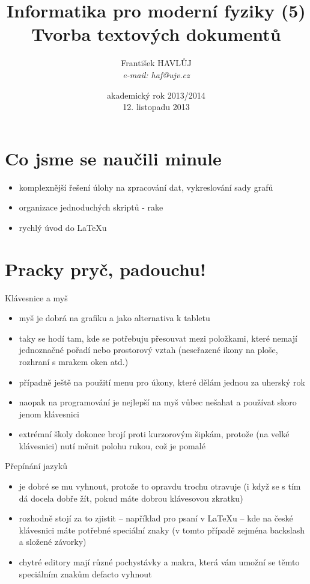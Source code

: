 \documentclass{beamer}
\title[IMF (5)]{Informatika pro moderní fyziky (5)\\ Tvorba textových dokumentů}
\author[Franti\v{s}ek HAVL\r{U}J, ORF ÚJV Řež]{Franti\v{s}ek HAVL\r{U}J\\{\scriptsize \emph{e-mail: haf@ujv.cz}}}
\date{akademický rok 2013/2014\\12. listopadu 2013}
\institute[ORF ÚJV Řež]
{ÚJV Řež\\oddělení Reaktorové fyziky a podpory palivového cyklu}
\begin{document}
\begin{frame}
  \titlepage
\end{frame}

\begin{frame}
  \tableofcontents
\end{frame}

\section{Co jsme se naučili minule}

\begin{frame}{}
  \begin{itemize}
    \item komplexnější řešení úlohy na zpracování dat, vykreslování sady grafů
    \item organizace jednoduchých skriptů - rake
    \item rychlý úvod do LaTeXu
  \end{itemize}
\end{frame}

\section{Pracky pryč, padouchu!}

\begin{frame}{Klávesnice a myš}
  \begin{itemize}
    \item myš je dobrá na grafiku a jako alternativa k tabletu
    \item taky se hodí tam, kde se potřebuju přesouvat mezi položkami, které nemají jednoznačné pořadí nebo prostorový vztah (neseřazené ikony na ploše, rozhraní s mrakem oken atd.)
    \item případně ještě na použití menu pro úkony, které dělám jednou za uherský rok
    \item naopak na programování je nejlepší na myš vůbec nešahat a používat skoro jenom klávesnici
    \item extrémní školy dokonce brojí proti kurzorovým šipkám, protože (na velké klávesnici) nutí měnit polohu rukou, což je pomalé
  \end{itemize}
\end{frame}

\begin{frame}{Přepínání jazyků}
  \begin{itemize}
    \item je dobré se mu vyhnout, protože to opravdu trochu otravuje (i když se s tím dá docela dobře žít, pokud máte dobrou klávesovou zkratku)
    \item rozhodně stojí za to zjistit -- například pro psaní v LaTeXu -- kde na české klávesnici máte potřebné speciální znaky (v tomto případě zejména backslash a složené závorky)
    \item chytré editory mají různé pochystávky a makra, která vám umožní se těmto speciálním znakům defacto vyhnout
  \end{itemize}
\end{frame}
\end{document}
